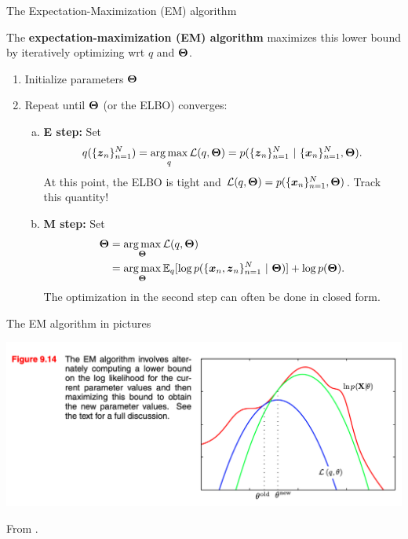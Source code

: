 \documentclass[aspectratio=169]{beamer}
\begin{document}
\begin{frame}{The Expectation-Maximization (EM) algorithm}

The \textbf{expectation-maximization (EM) algorithm} maximizes this lower bound by iteratively optimizing wrt $q$ and $\boldsymbol{\Theta}$. 

\begin{enumerate}
    \item Initialize parameters $\boldsymbol{\Theta}$
    \item Repeat until $\boldsymbol{\Theta}$ (or the ELBO) converges:
    \begin{enumerate}[a.]
        \item \textbf{E step: } Set
        \begin{align}
            q(\{\boldsymbol{z}_n\}_{n=1}^N) = \operatorname*{arg\,max}_q \mathcal{L}(q, \boldsymbol{\Theta}) = p(\{\boldsymbol{z}_n\}_{n=1}^N ~\vert~ \{\boldsymbol{x}_n\}_{n=1}^N, \boldsymbol{\Theta}).
        \end{align}
        At this point, the ELBO is tight and $\mathcal{L}(q, \boldsymbol{\Theta}) = p(\{\boldsymbol{x}_n\}_{n=1}^N, \boldsymbol{\Theta})$. Track this quantity!
        \item \textbf{M step: } Set 
        \begin{align}
            \boldsymbol{\Theta} &= \operatorname*{arg\,max}_{\boldsymbol{\Theta}} \mathcal{L}(q, \boldsymbol{\Theta}) \\
            &= \operatorname*{arg\,max}_{\boldsymbol{\Theta}} \mathbb{E}_q[\log p(\{\boldsymbol{x}_n, \boldsymbol{z}_n\}_{n=1}^N ~\vert~ \boldsymbol{\Theta})] + \log p(\boldsymbol{\Theta}).
        \end{align}
        The optimization in the second step can often be done in closed form. 
    \end{enumerate}
\end{enumerate}
\end{frame}

\begin{frame}{The EM algorithm in pictures}
\begin{center}
\includegraphics[width=.8\textwidth]{figures/lap6/em.png}    
\end{center}

\hfill From \citet{bishop2006pattern}.

\end{frame}
\end{document}
